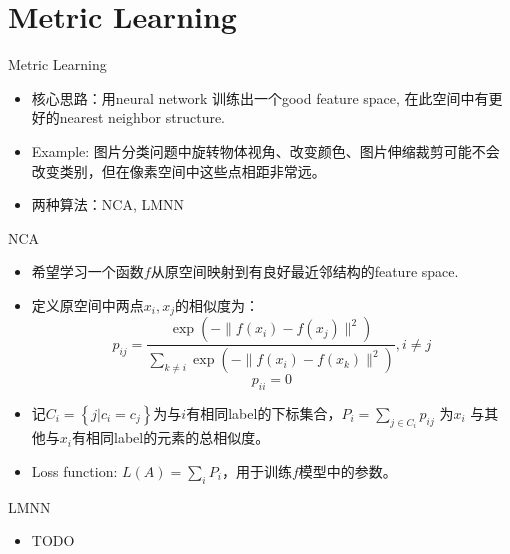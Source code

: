 \section{Metric Learning}

\begin{frame}{Metric Learning}
    \begin{itemize}
        \item 核心思路：用neural network 训练出一个good feature space, 在此空间中有更好的nearest neighbor structure.
        \item Example: 图片分类问题中旋转物体视角、改变颜色、图片伸缩裁剪可能不会改变类别，但在像素空间中这些点相距非常远。
        \item 两种算法：NCA, LMNN
    \end{itemize}
    
\end{frame}

\begin{frame}{NCA}
    \begin{itemize}
        \item 希望学习一个函数$f$从原空间映射到有良好最近邻结构的feature space.
        \item 定义原空间中两点$x_i, x_j$的相似度为：
        \[
        p_{ij} = \frac{\exp(-\|f(x_i) - f(x_j)\|^2)}{\sum_{k \neq i} \exp(-\|f(x_i) - f(x_k)\|^2)}, i \neq j
        \]
        \[
            p_{ii} = 0
        \]
        \item 记$C_i = \left\{ j | c_i = c_j \right\} $为与$i$有相同label的下标集合，$P_i = \sum_{j\in C_i} p_{ij}$ 为$x_i$ 与其他与$x_i$有相同label的元素的总相似度。
        \item Loss function: $L(A) = \sum_{i} P_i$，用于训练$f$模型中的参数。
    \end{itemize}
\end{frame}

\begin{frame}{LMNN}
    \begin{itemize}
        \item TODO
    \end{itemize}
\end{frame}